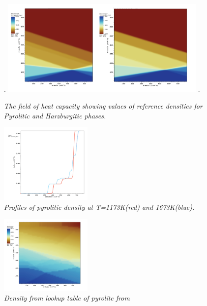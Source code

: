 \begin{figure}
\phantom.
\hfill
\includegraphics[width=0.9\textwidth]{cookbooks/phase_diagram/doc/pyrolite_harzburgite.png}
\hfill
\phantom.
\caption{\it The field of heat capacity showing values of reference densities for Pyrolitic and Harzburgitic phases.}
\label{fig:phase_diagram_ph_density}
\end{figure}

\begin{figure}
\centering
\includegraphics[width=0.4\textwidth]{cookbooks/phase_diagram/doc/pyrolite_linear.png}
\caption{\it Profiles of pyrolitic density at T=1173K(red) and 1673K(blue).}
\label{fig:phase_diagram_ph_profile}
\end{figure}
\begin{figure}
\centering
\includegraphics[width=0.4\textwidth]{cookbooks/phase_diagram/doc/steinberg.png}
\caption{\it Density from lookup table of pyrolite from \cite{stixrude2011thermodynamics}} %
\label{fig:phase_diagram_steinberg_density}
\end{figure}

